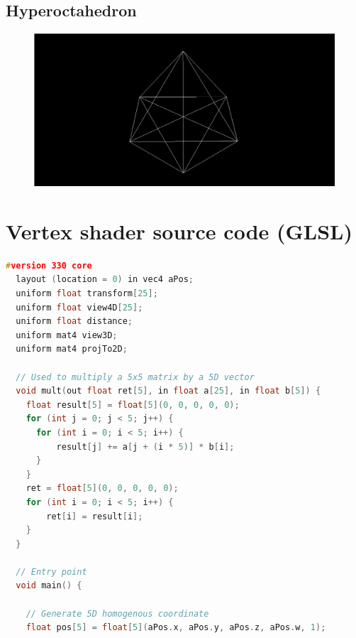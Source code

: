 \documentclass[11pt, a4paper]{article}
\begin{document}
\begin{appendices}


\pagebreak
\subsection*{Hyperoctahedron}

\begin{figure}[!h]
  \centering
  \includegraphics[width=\textwidth]{img/hyperoctahedron.png}
\end{figure}



\pagebreak
\section{Vertex shader source code (GLSL)}
\label{app:vertexShader}

\begin{lstlisting}[language=c++]
  #version 330 core
  layout (location = 0) in vec4 aPos;
  uniform float transform[25];
  uniform float view4D[25];
  uniform float distance;
  uniform mat4 view3D;
  uniform mat4 projTo2D;

  // Used to multiply a 5x5 matrix by a 5D vector
  void mult(out float ret[5], in float a[25], in float b[5]) {
    float result[5] = float[5](0, 0, 0, 0, 0);
    for (int j = 0; j < 5; j++) {
      for (int i = 0; i < 5; i++) {
          result[j] += a[j + (i * 5)] * b[i];
      }
    }
    ret = float[5](0, 0, 0, 0, 0);
    for (int i = 0; i < 5; i++) {
        ret[i] = result[i];
    }
  }

  // Entry point
  void main() {

    // Generate 5D homogenous coordinate
    float pos[5] = float[5](aPos.x, aPos.y, aPos.z, aPos.w, 1);


\end{lstlisting}
\end{appendices}
\end{document}
